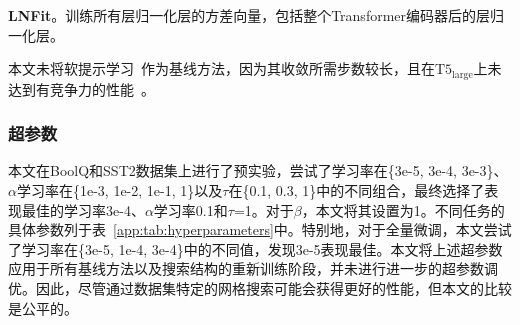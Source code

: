 \noindent\textbf{LNFit}。训练所有层归一化层的方差向量，包括整个Transformer编码器后的层归一化层。

本文未将软提示学习~\cite{lester2021power}作为基线方法，因为其收敛所需步数较长，且在$\text{T}5_{\text{large}}$上未达到有竞争力的性能~\cite{lester2021power}。


\subsubsection{超参数}
\label{app:hyperparameters}
本文在BoolQ和SST2数据集上进行了预实验，尝试了学习率在\{3e-5, 3e-4, 3e-3\}、$\alpha$学习率在\{1e-3, 1e-2, 1e-1, 1\}以及$\tau$在\{0.1, 0.3, 1\}中的不同组合，最终选择了表现最佳的学习率3e-4、$\alpha$学习率0.1和$\tau$=1。对于$\beta$，本文将其设置为1。不同任务的具体参数列于表~\ref{app:tab:hyperparameters}中。特别地，对于全量微调，本文尝试了学习率在\{3e-5, 1e-4, 3e-4\}中的不同值，发现3e-5表现最佳。本文将上述超参数应用于所有基线方法以及搜索结构的重新训练阶段，并未进行进一步的超参数调优。因此，尽管通过数据集特定的网格搜索可能会获得更好的性能，但本文的比较是公平的。

